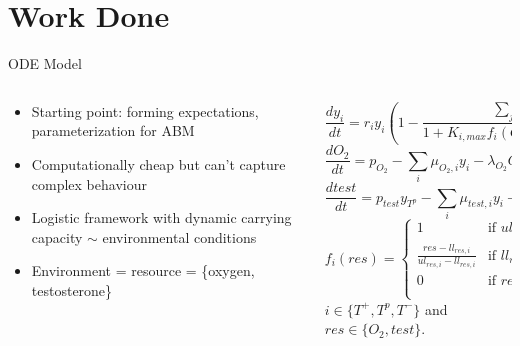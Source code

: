 \documentclass[aspectratio=169,9pt]{beamer}
\begin{document}
\section{Work Done}
\begin{frame}{ODE Model}
  \begin{columns}
    \begin{column}{0.4\textwidth}
      \begin{itemize}
        \item Starting point: forming expectations, parameterization for ABM
        \item Computationally cheap but can't capture complex behaviour
        \item Logistic framework with dynamic carrying capacity $\sim$ environmental conditions
        \item Environment = resource = \{oxygen, testosterone\}
      \end{itemize}
    \end{column}
    \begin{column}{0.6\textwidth}
      \begin{equation}
        \frac{dy_i}{dt} = r_i y_i (1 - \frac{\sum_j y_j}{1 + K_{i,max} f_i(O_2) f_i(test)} )- \delta_i y_i
        \label{celleq}
      \end{equation}
      \begin{equation}
        \frac{dO_2}{dt} = p_{O_2} - \sum_i \mu_{O_2,i} y_i - \lambda_{O_2} O_2
        \label{o2eq}
      \end{equation}
      \begin{equation}
        \frac{dtest}{dt} = p_{test} y_{T^p} - \sum_i \mu_{test,i} y_i - \lambda_{test} test
        \label{testeq}
      \end{equation}
      \begin{equation}
        f_i(res) = \begin{cases}
          1 &\text{if } ul_{res,i} \leq res\\
          \frac{res-ll_{res,i}}{ul_{res,i}-ll_{res,i}} &\text{if } ll_{res,i} < res < ul_{res,i}\\
          0 &\text{if } res \leq ll_{res,i}\\
        \end{cases}
        \label{freseq}
      \end{equation}
      $i \in \{T^+,T^p,T^-\}$ and $res \in \{O_2,test\}$.
    \end{column}
  \end{columns}
\end{frame}
\end{document}
